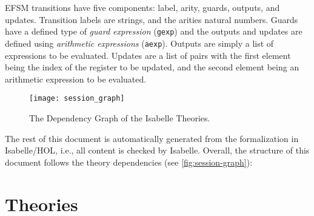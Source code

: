 \documentclass[10pt,DIV16,a4paper,abstract=true,twoside=semi,openright]{scrreprt}
\begin{document}
EFSM transitions have five components: label, arity, guards, outputs, and updates. Transition labels are strings, and the arities natural numbers. Guards have a defined type of \emph{guard expression} (\texttt{gexp}) and the outputs and updates are defined using \emph{arithmetic expressions} (\texttt{aexp}). Outputs are simply a list of expressions to be evaluated. Updates are a list of pairs with the first element being the index of the register to be updated, and the second element being an arithmetic expression to be evaluated.

\begin{figure}
  \centering
  \texttt{[image: session\_graph]}
  \caption{The Dependency Graph of the Isabelle Theories.\label{fig:session-graph}}
\end{figure}
The rest of this document is automatically generated from the
formalization in Isabelle/HOL, i.e., all content is checked by
Isabelle.  Overall, the structure of this document follows the
theory dependencies (see \autoref{fig:session-graph}):

\nocite{foster.ea:efsm:2018}

\clearpage
\chapter{Theories}




{\small
  
  
}
\end{document}

